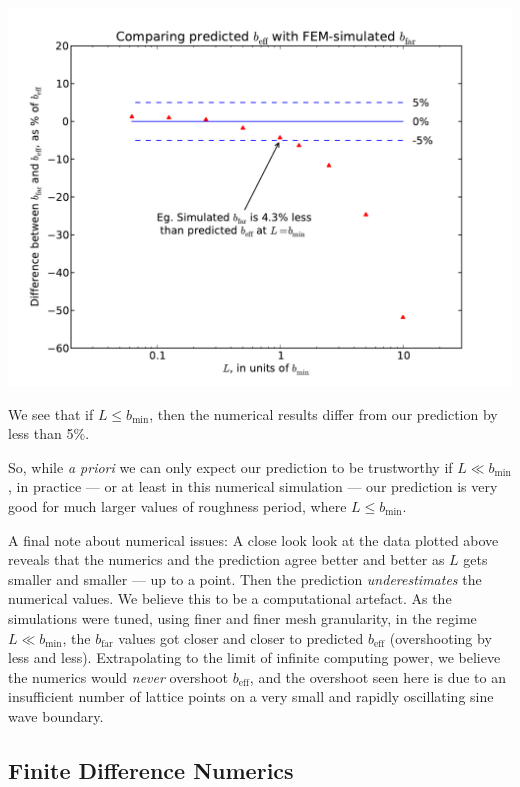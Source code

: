\documentclass[a4paper]{report}
\newcommand{\beff}{\ensuremath{b_{\mathrm{eff}}}}
\newcommand{\bmin}{\ensuremath{b_{\mathrm{min}}}}
\newcommand{\bfar}{\ensuremath{b_{\mathrm{far}}}}
\begin{document}
\begin{center}
\includegraphics[scale=0.595]{Lund_Thesis_FEM_plot_pcnt}
\end{center}

We see that if $L \leq \bmin$, then the numerical results differ from our prediction by less than 5\%.

So, while \emph{a priori} we can only expect our prediction to be trustworthy if $L \ll \bmin$, in practice --- or at least in this numerical simulation --- our prediction is very good for much larger values of roughness period, where $L \leq \bmin$.


\vspace{2em}

A final note about numerical issues:  A close look look at the data plotted above reveals that the numerics and the prediction agree better and better as $L$ gets smaller and smaller --- up to a point.  Then the prediction \emph{underestimates} the numerical values.  We believe this to be a computational artefact.  As the simulations were tuned, using finer and finer mesh granularity, in the regime $L \ll \bmin$, the $\bfar$ values got closer and closer to predicted $\beff$ (overshooting by less and less).  Extrapolating to the limit of infinite computing power, we believe the numerics would \emph{never} overshoot $\beff$, and the overshoot seen here is due to an insufficient number of lattice points on a very small and rapidly oscillating sine wave boundary.


\clearpage
\subsection*{Finite Difference Numerics}
\end{document}
